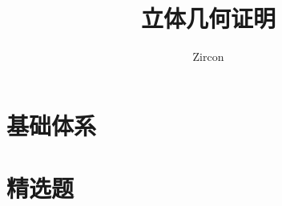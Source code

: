 \documentclass[oneside]{book}
\def\notetitle{立体几何证明}
\def\noteauthor{Zircon}
\def\notedate{}
\begin{document}
\title{\heiti \LARGE \notetitle \vspace*{8\baselineskip}}
\author{\noteauthor}
\date{\notedate}

\maketitle
\newpage

\setcounter{tocdepth}{1}
\tableofcontents
\newpage

\part{基础体系}





\part{精选题}

\end{document}
